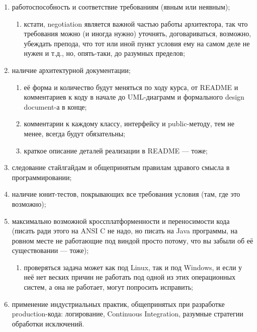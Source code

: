 \documentclass[a5paper]{article}
\begin{document}
\begin{enumerate}
	\item работоспособность и соответствие требованиям (явным или неявным);
  \begin{enumerate}
		\item кстати, negotiation является важной частью работы архитектора, так что требования можно (и иногда нужно) уточнять, договариваться, возможно, убеждать препода, что тот или иной пункт условия ему на самом деле не нужен и т.д., но, опять-таки, до разумных пределов;
  \end{enumerate}
	\item наличие архитектурной документации;
  \begin{enumerate}
		\item её форма и количество будут меняться по ходу курса, от README и комментариев к коду в начале до UML-диаграмм и формального design document-а в конце;
		\item комментарии к каждому классу, интерфейсу и public-методу, тем не менее, всегда будут обязательны;
		\item краткое описание деталей реализации в README --- тоже;
  \end{enumerate}
	\item следование стайлгайдам и общепринятым правилам здравого смысла в программировании;
	\item наличие юнит-тестов, покрывающих все требования условия (там, где это возможно);
	\item максимально возможной кроссплатформенности и переносимости кода (писать ради этого на ANSI C не надо, но писать на Java программы, на ровном месте не работающие под виндой просто потому, что вы забыли об её существовании --- тоже);
  \begin{enumerate}
		\item проверяться задача может как под Linux, так и под Windows, и если у неё нет веских причин не работать под одной из этих операционных систем, а она не работает, могут попросить исправить;
  \end{enumerate}
	\item применение индустриальных практик, общепринятых при разработке production-кода: логирование, Continuous Integration, разумные стратегии обработки исключений.
\end{enumerate}
\end{document}
